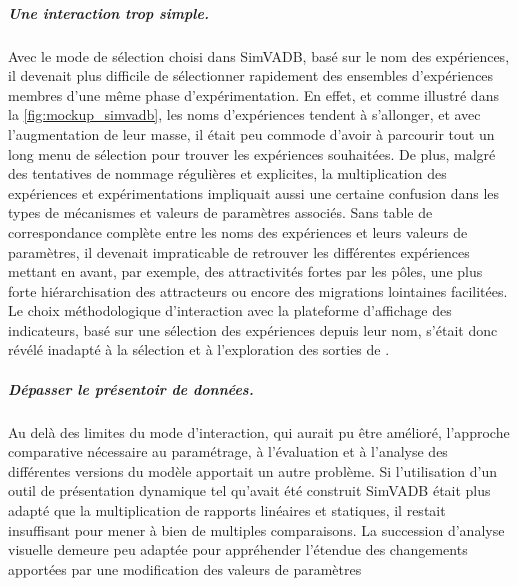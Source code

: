 \subparagraph{Une interaction trop simple.}
Avec le mode de sélection choisi dans SimVADB, basé sur le nom des expériences, il devenait plus difficile de sélectionner rapidement des ensembles d'expériences membres d'une même phase d'expérimentation.
En effet, et comme illustré dans la \cref{fig:mockup_simvadb}, les noms d'expériences tendent à s'allonger, et avec l'augmentation de leur masse, il était peu commode d'avoir à parcourir tout un long menu de sélection pour trouver les expériences souhaitées.
De plus, malgré des tentatives de nommage régulières et explicites, la multiplication des expériences et expérimentations impliquait aussi une certaine confusion dans les types de mécanismes et valeurs de paramètres associés.
Sans table de correspondance complète entre les noms des expériences et leurs valeurs de paramètres, il devenait impraticable de retrouver les différentes expériences mettant en avant, par exemple, des attractivités fortes par les pôles, une plus forte hiérarchisation des attracteurs ou encore des migrations lointaines facilitées.
Le choix méthodologique d'interaction avec la plateforme d'affichage des indicateurs, basé sur une sélection des expériences depuis leur nom, s'était donc révélé inadapté à la sélection et à l'exploration des sorties de \simfeodal{}.

\subparagraph{Dépasser le \og présentoir\fg{} de données.}
Au delà des limites du mode d'interaction, qui aurait pu être amélioré, l'approche comparative nécessaire au paramétrage, à l'évaluation et à l'analyse des différentes versions du modèle apportait un autre problème.
Si l'utilisation d'un outil de présentation dynamique tel qu'avait été construit SimVADB était plus adapté que la multiplication de rapports linéaires et statiques, il restait insuffisant pour mener à bien de multiples comparaisons.
La succession d'analyse visuelle demeure peu adaptée pour appréhender l'étendue des changements apportées par une modification des valeurs de paramètres

